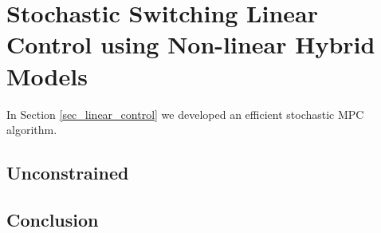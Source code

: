 \chapter{Stochastic Switching Linear Control using Non-linear Hybrid Models}
\label{sec_rbpf_control}
In Section \ref{sec_linear_control} we developed an efficient stochastic MPC algorithm.

\section{Unconstrained}

\section{Conclusion}

